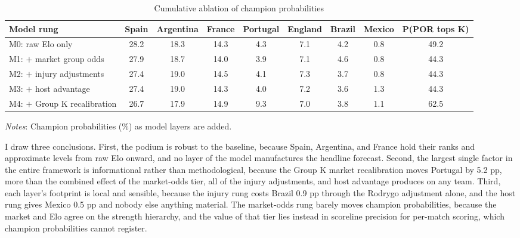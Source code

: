 \documentclass[11pt,letterpaper]{article}
\begin{document}
\begin{table}[!t]
  \centering
  \caption{Cumulative ablation of champion probabilities}\label{tab:ablation}
  \begin{footnotesize}
  \begin{threeparttable}
    {\footnotesize\begin{tabular*}{\textwidth}{@{\extracolsep{\fill}} lcccccccc}
      \toprule
      Model rung & Spain & Argentina & France & Portugal & England & Brazil & Mexico & P(POR tops K) \\
      \midrule
      M0: raw Elo only          & 28.2 & 18.3 & 14.3 & 4.3 & 7.1 & 4.2 & 0.8 & 49.2 \\
      M1: $+$ market group odds & 27.9 & 18.7 & 14.0 & 3.9 & 7.1 & 4.6 & 0.8 & 44.3 \\
      M2: $+$ injury adjustments& 27.4 & 19.0 & 14.5 & 4.1 & 7.3 & 3.7 & 0.8 & 44.3 \\
      M3: $+$ host advantage    & 27.4 & 19.0 & 14.3 & 4.0 & 7.2 & 3.6 & 1.3 & 44.3 \\
      M4: $+$ Group K recalibration & 26.7 & 17.9 & 14.9 & 9.3 & 7.0 & 3.8 & 1.1 & 62.5 \\
      \bottomrule
    \end{tabular*}}
    \begin{tablenotes}\notesize
      \item \textit{Notes}: Champion probabilities (\%) as model layers are added.
    \end{tablenotes}
  \end{threeparttable}
  \end{footnotesize}
\end{table}

I draw three conclusions. First, the podium is robust to the baseline, because Spain, Argentina, and France hold their ranks and approximate levels from raw Elo onward, and no layer of the model manufactures the headline forecast. Second, the largest single factor in the entire framework is informational rather than methodological, because the Group K market recalibration moves Portugal by 5.2 pp, more than the combined effect of the market-odds tier, all of the injury adjustments, and host advantage produces on any team. Third, each layer's footprint is local and sensible, because the injury rung costs Brazil 0.9 pp through the Rodrygo adjustment alone, and the host rung gives Mexico 0.5 pp and nobody else anything material. The market-odds rung barely moves champion probabilities, because the market and Elo agree on the strength hierarchy, and the value of that tier lies instead in scoreline precision for per-match scoring, which champion probabilities cannot register.
\end{document}
